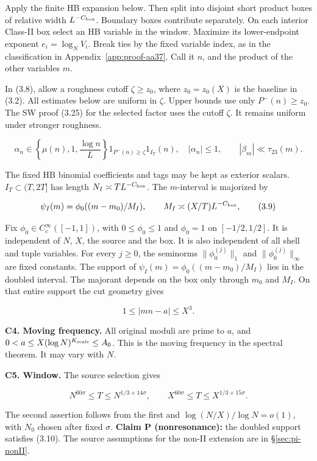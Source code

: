 Apply the finite HB expansion below.
Then split into disjoint short product boxes of
relative width $L^{-C_{\rm box}}$. Boundary boxes contribute separately.
On each interior Class-II box select an HB variable in the window.
Maximize its lower-endpoint exponent $e_i=\log_N V_i$.
Break ties by the fixed variable index, as in the classification in
Appendix~\ref{app:proof-aa37}.
Call it $n$, and the product of the other variables $m$.

In (3.8), allow a roughness cutoff $\zeta\ge z_0$,
where $z_0=z_0(X)$ is the baseline in (3.2).
All estimates below are uniform in $\zeta$.
Upper bounds use only $P^-(n)\ge z_0$.
The SW proof (3.25) for the selected factor uses the cutoff $\zeta$.
It remains uniform under stronger roughness.

\[
\alpha_n\in\left\{\mu(n),1,\frac{\log n}{L}\right\}
1_{P^-(n)\ge \zeta}1_{I_T}(n),\quad |\alpha_n|\le1,
\qquad |\beta_m|\ll\tau_{23}(m).
\tag{3.8}
\]

The fixed HB binomial coefficients and tags may be kept as exterior
scalars. $I_T\subset(T,2T]$ has length $N_I\asymp TL^{-C_{\rm box}}$.
The $m$-interval is majorized by

\[
\psi_I(m)=\phi_0((m-m_0)/M_I),\qquad
M_I\asymp (X/T)L^{-C_{\rm box}},
\tag{3.9}
\]

Fix $\phi_0\in C_c^\infty([-1,1])$, with $0\le\phi_0\le1$ and $\phi_0=1$ on $[-1/2,1/2]$.
It is independent of $N$, $X$, the source and the box.
It is also independent of all shell and tuple variables.
For every $j\ge0$, the seminorms $\|\phi_0^{(j)}\|_1$ and $\|\phi_0^{(j)}\|_\infty$ are fixed constants.
The support of $\psi_I(m)=\phi_0((m-m_0)/M_I)$ lies in the doubled interval.
The majorant depends on the box only through $m_0$ and $M_I$.
On that entire support the cut geometry gives

\[
1\le |mn-a|\le X^3.
\tag{3.10}
\]

\textbf{C4. Moving frequency.} All original moduli are prime to $a$,
and $0<a\le X(\log N)^{K_{\rm scale}}\le A_0$. This is the moving
frequency in the spectral theorem. It may vary with $N$.

\textbf{C5. Window.} The source selection gives

\[
N^{60\sigma}\le T\le N^{1/3+14\sigma},\qquad
X^{60\sigma}\le T\le X^{1/3+15\sigma}.
\tag{3.11}
\]

The second assertion follows from the first and
$\log(N/X)/\log N=o(1)$, with $N_0$ chosen after fixed
$\sigma$. \textbf{Claim P (nonresonance):} the doubled support satisfies (3.10).
The source assumptions for the non-II
extension are in \S\ref{sec:pi-nonII}.

